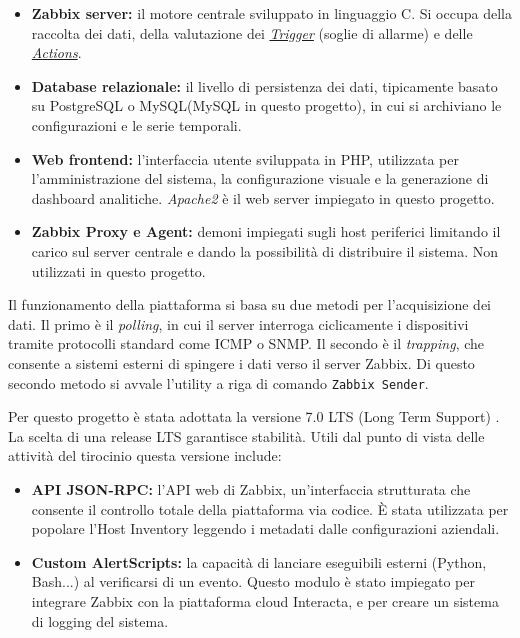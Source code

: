 \documentclass[12pt, a4paper, oneside]{report}
\begin{document}
\begin{itemize}
    \item \textbf{Zabbix server:} il motore centrale sviluppato in linguaggio C. Si occupa della raccolta dei dati, della valutazione dei \hyperlink{glo:trigger}{\textit{Trigger}} (soglie di allarme) e delle \hyperlink{glo:action}{\textit{Actions}}.
    \item \textbf{Database relazionale:} il livello di persistenza dei dati, tipicamente basato su PostgreSQL o MySQL(MySQL in questo progetto), in cui si archiviano le configurazioni e le serie temporali.
    \item \textbf{Web frontend:} l'interfaccia utente sviluppata in PHP, utilizzata per l'amministrazione del sistema, la configurazione visuale e la generazione di dashboard analitiche. \emph{Apache2} è il web server impiegato in questo progetto.
    \item \textbf{Zabbix Proxy e Agent:} demoni impiegati sugli host periferici limitando il carico sul server centrale e dando la possibilità di distribuire il sistema. Non utilizzati in questo progetto.
\end{itemize}
Il funzionamento della piattaforma si basa su due metodi per l'acquisizione dei dati. Il primo è il \textit{polling}, in cui il server interroga ciclicamente i dispositivi tramite protocolli standard come ICMP o SNMP. Il secondo è il \textit{trapping}, che consente a sistemi esterni di spingere i dati verso il server Zabbix. Di questo secondo metodo si avvale l'utility a riga di comando \texttt{Zabbix Sender}.

Per questo progetto è stata adottata la versione 7.0 LTS (Long Term Support) \parencite{zabbix7_Docs}. La scelta di una release LTS garantisce stabilità. Utili dal punto di vista delle attività del tirocinio questa versione include:

\begin{itemize}
    \item \textbf{API JSON-RPC:} l’API web di Zabbix, un'interfaccia strutturata che consente il controllo totale della piattaforma via codice. È stata utilizzata per popolare l'Host Inventory leggendo i metadati dalle configurazioni aziendali.
    \item \textbf{Custom AlertScripts:} la capacità di lanciare eseguibili esterni (Python, Bash...) al verificarsi di un evento. Questo modulo è stato impiegato per integrare Zabbix con la piattaforma cloud Interacta, e per creare un sistema di logging del sistema.
\end{itemize}
\end{document}
